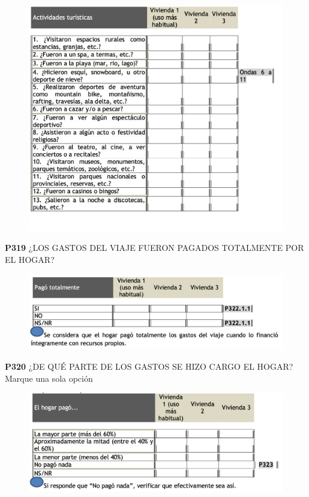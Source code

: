 \documentclass[
  openany]{book}
\begin{document}
\begin{figure}

{\centering \includegraphics[width=1\linewidth]{imagenes/figura6-168} 

}

\end{figure}

\textbf{P319} ¿LOS GASTOS DEL VIAJE FUERON PAGADOS TOTALMENTE POR EL HOGAR?

\begin{figure}

{\centering \includegraphics[width=1\linewidth]{imagenes/figura6-169} 

}

\end{figure}

\textbf{P320} ¿DE QUÉ PARTE DE LOS GASTOS SE HIZO CARGO EL HOGAR?
Marque una sola opción

\begin{figure}

{\centering \includegraphics[width=1\linewidth]{imagenes/figura6-170} 

}

\end{figure}
\end{document}
